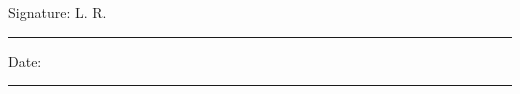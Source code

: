 \documentclass[11pt,oneside]{book}
\begin{document}
\noindent Signature: L. R.\\[1mm]
\rule[1em]{25em}{0.5pt}

\noindent Date:\\[1mm]
\rule[1em]{25em}{0.5pt}





\tableofcontents
\listoffigures
\listoftables


\mainmatter







\printbibliography

\begin{appendices}


\end{appendices}
\end{document}
